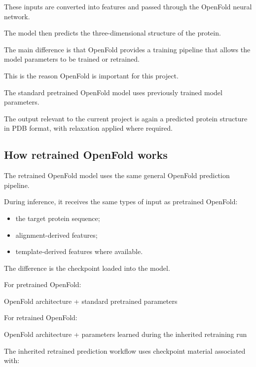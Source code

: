 \documentclass[11pt,a4paper]{article}
\begin{document}
These inputs are converted into features and passed through the OpenFold neural network.

The model then predicts the three-dimensional structure of the protein.

The main difference is that OpenFold provides a training pipeline that allows the model parameters to be trained or retrained.

This is the reason OpenFold is important for this project.

The standard pretrained OpenFold model uses previously trained model parameters.

The output relevant to the current project is again a predicted protein structure in PDB format, with relaxation applied where required.


\subsection{How retrained OpenFold works}

The retrained OpenFold model uses the same general OpenFold prediction pipeline.

During inference, it receives the same types of input as pretrained OpenFold:

\begin{itemize}[leftmargin=*]

    \item the target protein sequence;

    \item alignment-derived features;

    \item template-derived features where available.

\end{itemize}

The difference is the checkpoint loaded into the model.

For pretrained OpenFold:

\begin{center}
OpenFold architecture + standard pretrained parameters
\end{center}

For retrained OpenFold:

\begin{center}
OpenFold architecture + parameters learned during the inherited retraining run
\end{center}

The inherited retrained prediction workflow uses checkpoint material associated with:
\end{document}
